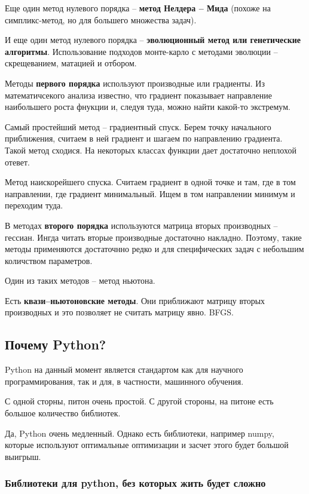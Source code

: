 Еще один метод нулевого порядка -- \textbf{метод Нелдера -- Мида} (похоже на симпликс-метод, но для большего множества задач).

И еще один метод нулевого порядка -- \textbf{эволюционный метод или генетические алгоритмы}.
Использование подходов монте-карло с методами эволюции -- скрещеванием, матацией и отбором.

Методы \textbf{первого порядка} используют производные или градиенты.
Из математичсекого анализа известно, что градиент показывает направление наибольшего роста фнукции и, следуя туда, можно найти какой-то экстремум.

Самый простейший метод -- градиентный спуск.
Берем точку начального приближения, считаем в ней градиент и шагаем по направлению градиента.
Такой метод сходися.
На некоторых классах функции дает достаточно неплохой отевет.

Метод наискорейшего спуска.
Считаем градиент в одной точке и там, где в том направлении, где градиент минимальный.
Ищем в том направлении минимум и переходим туда.

В методах \textbf{второго порядка} используются матрица вторых производных -- гессиан.
Ингда читать вторые производные достаточно накладно.
Поэтому,  такие методы применяются достаточнно редко и для специфических задач с небольшим количством параметров.

Один из таких методов -- метод ньютона.

Есть \textbf{квази--ньютоновские методы}.
Они приближают матрицу вторых производных и это позволяет не считать матрицу явно.
BFGS.


\subsection{Почему Python?}
Python на данный момент является стандартом как для научного программирования, так и для, в частности, машинного обучения.

С одной сторны, питон очень простой.
С другой стороны, на питоне есть большое количество библиотек.

Да, Python очень медленный.
Однако есть библиотеки, например numpy, которые используют оптимальные оптимизации и засчет этого будет большой выигрыш.

\subsubsection{Библиотеки для python, без которых жить будет сложно}

